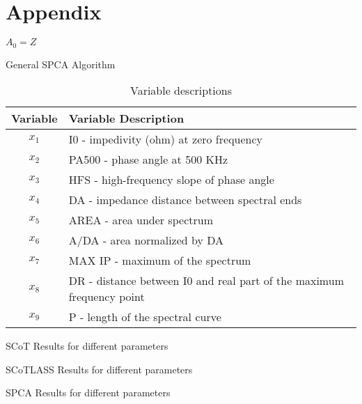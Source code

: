\documentclass[11pt,letterpaper]{report}
\begin{document}
\pagebreak



\pagebreak
\appendix
\section*{Appendix}

\begin{algorithm}[H]
\SetAlgoLined
{}
$A_0 = Z$\;
\caption{General SPCA Algorithm}
\label{algo1:SPCA}
\end{algorithm}

\begin{table}[htpb!]
\caption{Variable descriptions}
\label{tab1:dta_vars}
\begin{center}
 \begin{tabular}{||c l||}
 \hline
Variable & Variable Description \\ [0.5ex] 
 \hline\hline
 $x_{1}$ & I0 - impedivity (ohm) at zero frequency \\ 
 \hline
 $x_{2}$ & 	PA500 - phase angle at 500 KHz \\
 \hline
 $x_{3}$ & HFS - high-frequency slope of phase angle \\
 \hline
 $x_{4}$ & DA - impedance distance between spectral ends \\
 \hline
 $x_{5}$ & AREA - area under spectrum \\
 \hline
 $x_{6}$ & 	A/DA - area normalized by DA \\
 \hline
 $x_{7}$ & MAX IP - maximum of the spectrum \\
 \hline
 $x_{8}$ & 	DR - distance between I0 and real part of the maximum frequency point \\
 \hline
 $x_{9}$ & P - length of the spectral curve \\ [1ex] 
 \hline
\end{tabular}
\end{center}
\end{table}

\begin{table}[htpb!]
    \centering
    \caption{SCoT Results for different parameters}
    \label{rstl:scot}
    
\end{table}

\begin{table}[htpb!]
    \centering
    \caption{SCoTLASS Results for different parameters}
    \label{rstl:scotlass}
    
\end{table}

\begin{table}[htpb!]
    \centering
    \caption{SPCA Results for different parameters}
    \label{rstl:spca}
    
\end{table}
\end{document}
